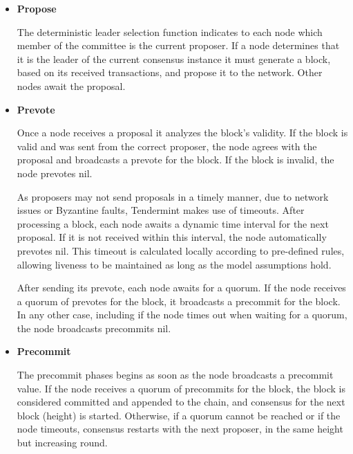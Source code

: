

\begin{itemize}
    \item \textbf{Propose}

    The deterministic leader selection function indicates to each node which member of the committee is the current proposer. If a node determines that it is the leader of the current consensus instance it must generate a block, based on its received transactions, and propose it to the network.    Other nodes await the proposal.
    
    \item \textbf{Prevote}

    Once a node receives a proposal it analyzes the block's validity. If the block is valid and was sent from the correct proposer, the node agrees with the proposal and broadcasts a prevote for the block. If the block is invalid, the node prevotes nil. 

    As proposers may not send proposals in a timely manner, due to network issues or Byzantine faults, Tendermint makes use of timeouts. After processing a block, each node awaits a dynamic time interval for the next proposal.  If it is not received within this interval, the node automatically prevotes nil. This timeout is calculated locally according to pre-defined rules, allowing liveness to be maintained as long as the model assumptions hold. 

 After sending its prevote, each node awaits for a quorum. If the node receives a quorum of prevotes for the block, 
 it broadcasts a precommit for the block.   In any other case, including if the node times out when waiting for a quorum, the node 
 broadcasts precommits nil. 
    
    \item \textbf{Precommit}

The precommit phases begins as soon as the node broadcasts a precommit value. If the node receives a quorum of precommits for the block, the block is considered committed and appended to the chain, and consensus for the next block (height) is started.
 Otherwise, if a quorum cannot be reached or if the node timeouts, consensus restarts with the next proposer, in the same height but increasing round. 

\end{itemize}


